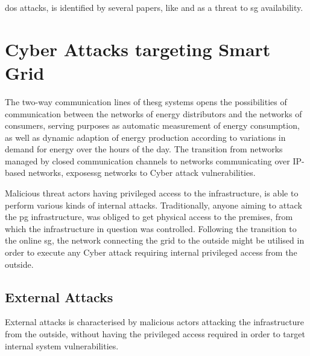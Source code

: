\acrfull{dos} attacks, is identified by several papers, like  \cite{sundararajan2019survey} and \cite{gupta2017survey} as  a threat to \acrshort{sg} availability. \\ 








\section{Cyber Attacks targeting Smart Grid}

The two-way communication lines of the\acrlong{sg} systems opens the possibilities of communication between the networks of energy distributors and the networks of consumers, serving purposes as automatic measurement of energy consumption, as well as dynamic adaption of energy production according to variations in demand for energy over the hours of the day.
The transition from networks managed by closed communication channels to networks communicating over IP-based networks, exposes\acrlong{sg} networks to Cyber attack vulnerabilities.



Malicious threat actors having privileged access to the infrastructure, is able to perform various kinds of internal attacks. Traditionally, anyone aiming to attack the \acrlong{pg} infrastructure, was obliged to get physical access to the premises, from which the infrastructure in question was controlled. Following the transition to the online \acrshort{sg}, the network connecting the grid to the outside might be utilised in order to execute any Cyber attack requiring internal privileged access from the outside.


\subsection{External Attacks}
External attacks is characterised by malicious actors attacking the infrastructure from the outside, without having the privileged access required in order to target internal system vulnerabilities.





